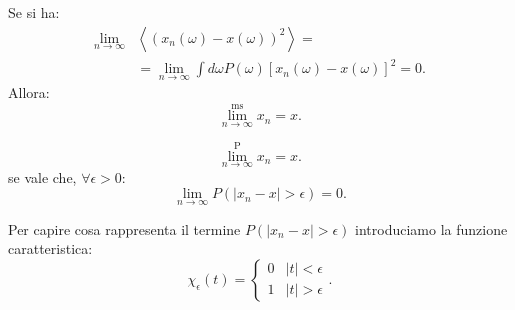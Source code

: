 \begin{defn}[\textcolor{red}{Mean Square Limit}]
    Se si ha:
    \[\begin{aligned}
	\lim_{n \to \infty} & 
	\left<\left(x_n(\omega) -x(\omega) \right)^2\right> =\\
			    &=\lim_{n \to \infty} 
			    \int  d\omega  P(\omega) 
			    \left[ x_n(\omega) -x(\omega) \right]^2 = 0
    .\end{aligned}\]
    Allora:
    \[
        \lim^{\text{ms}}_{n \to \infty} x_n = x
    .\] 
\end{defn}
\begin{defn}[\textcolor{red}{Limite in probabilità}] 
    \[
        \lim^{\text{P}}_{n \to \infty} x_n = x
    .\] 
    se vale che, $ \forall \epsilon  > 0$:
    \[
	\lim_{n \to \infty} P(\left|x_n-x\right| > \epsilon) = 0
    .\] 
\end{defn}
\noindent
Per capire cosa rappresenta il termine $P(\left|x_n - x\right|>\epsilon)$ introduciamo la funzione caratteristica:
\[
    \chi_\epsilon (t) = 
    \begin{cases}
	0 & \left|t\right|< \epsilon\\
	1 & \left|t\right|>\epsilon
    \end{cases}
.\] 

